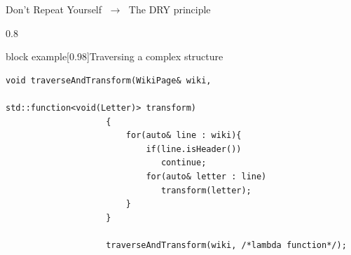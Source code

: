 \begin{frame}[fragile]{Don't Repeat Yourself $\;\to\;$ The DRY principle}
\begin{overlayarea}{\textwidth}{0.8\textheight}
\begin{varblock}{block example}[0.98\textwidth]{Traversing a complex structure}
\begin{onlyenv}
                \begin{lstlisting}[style=MyCpp]
                    void traverseAndTransform(WikiPage& wiki,
                                              std::function<void(Letter)> transform)
                    {
                        for(auto& line : wiki){
                            if(line.isHeader())
                               continue;
                            for(auto& letter : line)
                               transform(letter);
                        }
                    }

                    traverseAndTransform(wiki, /*lambda function*/);
                \end{lstlisting}
            \end{onlyenv}
        \end{varblock}
    \end{overlayarea}
\end{frame}

